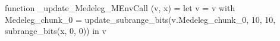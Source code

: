 function _update_Medeleg_MEnvCall (v, x) = let v = { v with Medeleg_chunk_0 = update_subrange_bits(v.Medeleg_chunk_0, 10, 10, subrange_bits(x, 0, 0)) } in
  v
